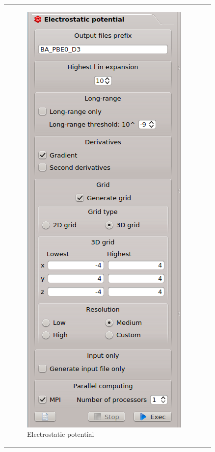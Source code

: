 \documentclass[10pt]{article}
\begin{document}
\begin{tabular}{lr}
\begin{minipage}{.4\linewidth}
\begin{figure}[H]
\begin{center}
\vspace*{-5mm}
\includegraphics[width=.65\linewidth]{damqt_fig_2_4_1.png}
\end{center}
\caption{Electrostatic potential \label{fig:2_4_1}}
\end{figure}
\end{minipage}
\end{tabular}
\vspace*{0.1mm}
\end{document}
